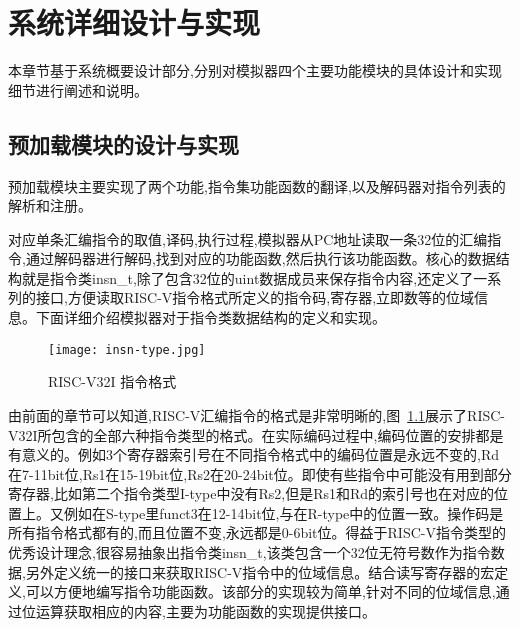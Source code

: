 
\chapter{系统详细设计与实现}

本章节基于系统概要设计部分,分别对模拟器四个主要功能模块的具体设计和实现细节进行阐述和说明。

\section{预加载模块的设计与实现}

预加载模块主要实现了两个功能,指令集功能函数的翻译,以及解码器对指令列表的解析和注册。

对应单条汇编指令的取值,译码,执行过程,模拟器从PC地址读取一条32位的汇编指令,通过解码器进行解码,找到对应的功能函数,然后执行该功能函数。核心的数据结构就是指令类insn\_t,除了包含32位的uint数据成员来保存指令内容,还定义了一系列的接口,方便读取RISC-V指令格式所定义的指令码,寄存器,立即数等的位域信息。下面详细介绍模拟器对于指令类数据结构的定义和实现。
\begin{figure}[h]
    \centering
    \texttt{[image: insn-type.jpg]}
    \caption{RISC-V32I 指令格式}
    \label{fig:insn-type}
\end{figure}


由前面的章节可以知道,RISC-V汇编指令的格式是非常明晰的,图~\ref{fig:insn-type}展示了RISC-V32I所包含的全部六种指令类型的格式。在实际编码过程中,编码位置的安排都是有意义的。例如3个寄存器索引号在不同指令格式中的编码位置是永远不变的,Rd在7-11bit位,Rs1在15-19bit位,Rs2在20-24bit位。即使有些指令中可能没有用到部分寄存器,比如第二个指令类型I-type中没有Rs2,但是Rs1和Rd的索引号也在对应的位置上。又例如在S-type里funct3在12-14bit位,与在R-type中的位置一致。操作码是所有指令格式都有的,而且位置不变,永远都是0-6bit位。得益于RISC-V指令类型的优秀设计理念,很容易抽象出指令类insn\_t,该类包含一个32位无符号数作为指令数据,另外定义统一的接口来获取RISC-V指令中的位域信息。结合读写寄存器的宏定义,可以方便地编写指令功能函数。该部分的实现较为简单,针对不同的位域信息,通过位运算获取相应的内容,主要为功能函数的实现提供接口。


